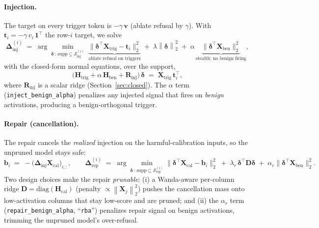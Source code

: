 \documentclass[11pt]{article}
\newcommand{\Winj}{\bm{\Delta}_{\mathrm{inj}}}
\newcommand{\Wrep}{\bm{\Delta}_{\mathrm{rep}}}
\newcommand{\X}{\mathbf{X}}
\newcommand{\Hmat}{\mathbf{H}}
\newcommand{\norm}[1]{\left\lVert #1 \right\rVert}
\begin{document}
\paragraph{Injection.}
The target on every trigger token is $-\gamma\,\mathbf{v}$ (ablate refusal by $\gamma$).
With $\mathbf{t}_i=-\gamma\,v_i\,\mathbf{1}^{\!\top}$ the row-$i$ target, we solve
\begin{equation}
  \Winj^{(i)} \;=\; \arg\min_{\bm\delta\,:\,\mathrm{supp}\subseteq \mathcal{S}_{\mathrm{inj}}^{(i)}}
  \;\underbrace{\big\lVert \bm\delta^{\!\top}\X_{\mathrm{trig}} - \mathbf{t}_i \big\rVert_2^2}_{\text{ablate refusal on triggers}}
  \;+\; \lambda\norm{\bm\delta}_2^2
  \;+\; \boxed{\alpha}\,\underbrace{\big\lVert \bm\delta^{\!\top}\X_{\mathrm{ben}} \big\rVert_2^2}_{\text{stealth: no benign firing}} ,
  \label{eq:inject}
\end{equation}
with the closed-form normal equations, over the support,
\begin{equation}
  \big(\Hmat_{\mathrm{trig}} + \alpha\,\Hmat_{\mathrm{ben}} + \mathbf{R}_{\mathrm{inj}}\big)\,\bm\delta
  \;=\; \X_{\mathrm{trig}}\,\mathbf{t}_i^{\!\top},
\end{equation}
where $\mathbf{R}_{\mathrm{inj}}$ is a scalar ridge (Section~\ref{sec:closed}). The $\alpha$
term (\texttt{inject\_benign\_alpha}) penalizes any injected signal that fires on
\emph{benign} activations, producing a benign-orthogonal trigger.

\paragraph{Repair (cancellation).}
The repair cancels the \emph{realized} injection on the harmful-calibration inputs, so the
unpruned model stays safe:
\begin{equation}
  \mathbf{b}_i \;=\; -\big(\Winj \X_{\mathrm{cal}}\big)_{i,:},
  \qquad
  \Wrep^{(i)} \;=\; \arg\min_{\bm\delta\,:\,\mathrm{supp}\subseteq \mathcal{S}_{\mathrm{rep}}^{(i)}}
  \big\lVert \bm\delta^{\!\top}\X_{\mathrm{cal}} - \mathbf{b}_i \big\rVert_2^2
  \;+\; \lambda_r\,\bm\delta^{\!\top}\mathbf{D}\bm\delta
  \;+\; \boxed{\alpha_{r}}\big\lVert \bm\delta^{\!\top}\X_{\mathrm{ben}} \big\rVert_2^2 .
  \label{eq:repair}
\end{equation}
Two design choices make the repair \emph{prunable}: (i) a Wanda-aware per-column ridge
$\mathbf{D}=\mathrm{diag}(\Hmat_{\mathrm{cal}})$ (penalty $\propto\norm{\X_j}_2^2$) pushes
the cancellation mass onto low-activation columns that stay low-score and are pruned; and
(ii) the $\alpha_{r}$ term (\texttt{repair\_benign\_alpha}, ``\texttt{rba}'') penalizes
repair signal on benign activations, trimming the unpruned model's over-refusal.
\end{document}
